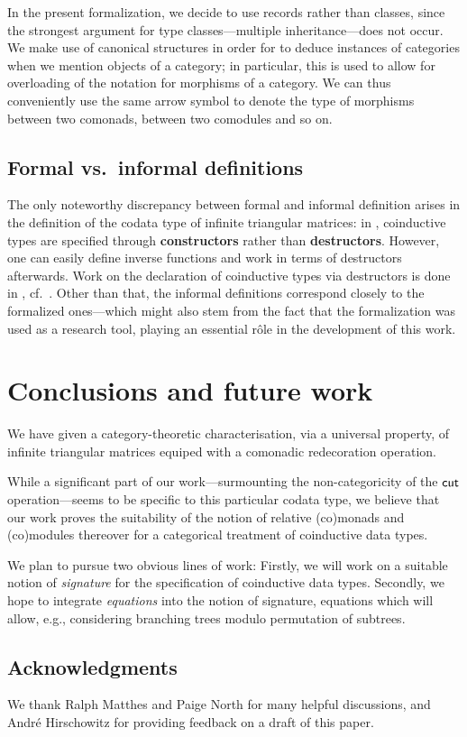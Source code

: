 \documentclass[conference,10pt]{IEEEtran}
\newcommand{\fat}[1]{\textbf{#1}}
\begin{document}
In the present formalization, we decide to use records rather than classes, since the strongest argument for type classes---multiple inheritance---does 
not occur.
We make use of canonical structures in order for \coq to deduce instances of categories when we mention objects of a category; 
in particular, this is used to allow for overloading of the notation for morphisms of a category.
We can thus conveniently use the same arrow symbol to denote the type of morphisms between two comonads, between two comodules and so on.


\subsection{Formal vs.\ informal definitions}

The only noteworthy discrepancy between formal and informal definition arises in the definition of the codata type of infinite 
triangular matrices:
in \coq, coinductive types are specified through \fat{constructors} rather than \fat{destructors}.
However, one can easily define inverse functions and work in terms of destructors afterwards.
Work on the declaration of coinductive types via destructors is done in \agda, cf.\ \parencite{DBLP:conf/popl/AbelPTS13}.
Other than that, the informal definitions correspond closely to the formalized ones---which might also stem from the fact that 
the formalization was used as a research tool, playing an essential r\^ole in the development of this work.

\section{Conclusions and future work}



We have given a category-theoretic characterisation, via a universal property, of infinite triangular matrices
equiped with a comonadic redecoration operation.

While a significant part of our work---surmounting the non-categoricity of the $\mathsf{cut}$ operation---seems to be specific to this particular codata type,
we believe that our work proves the suitability of the notion of relative (co)monads and (co)modules thereover for 
a categorical treatment of coinductive data types.


We plan to pursue two obvious lines of work:
Firstly, we will work on a suitable notion of \emph{signature} for the specification of coinductive data types.
Secondly, we hope to integrate \emph{equations} into the notion of signature, equations which 
will allow, e.g., considering branching trees modulo permutation of subtrees.
 

\subsection*{Acknowledgments}
 We thank Ralph Matthes and Paige North for many helpful discussions, and Andr\'e Hirschowitz for providing feedback on
 a draft of this paper.

\printbibliography


\cleardoublepage
\appendix


\end{document}
